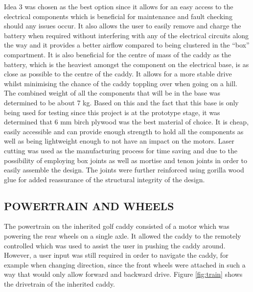 \documentclass[11pt,landscape]{article}
\begin{document}
\begin{multicols}{2}
    
    Idea 3 was chosen as the best option since it allows for an easy access to
    the electrical components which is beneficial for maintenance and fault
    checking should any issues occur. It also allows the user to easily remove
    and charge the battery when required without interfering with any of the
    electrical circuits along the way and it provides a better airflow compared
    to being clustered in the “box” compartment. It is also beneficial for the
    centre of mass of the caddy as the battery, which is the heaviest amongst
    the component on the electrical base, is as close as possible to the centre
    of the caddy. It allows for a more stable drive whilst minimising the chance
    of the caddy toppling over when going on a hill. The combined weight of all
    the components that will be in the base was determined to be about 7 kg.
    Based on this and the fact that this base is only being used for testing
    since this project is at the prototype stage, it was determined that 6 mm
    birch plywood was the best material of choice. It is cheap, easily
    accessible and can provide enough strength to hold all the components as
    well as being lightweight enough to not have an impact on the motors. Laser
    cutting was used as the manufacturing process for time saving and due to the
    possibility of employing box joints as well as mortise and tenon joints in
    order to easily assemble the design. The joints were further reinforced
    using gorilla wood glue for added reassurance of the structural integrity of
    the design.
    
    
    
    
    \subsection{POWERTRAIN AND WHEELS}
    The powertrain on the inherited golf caddy consisted of a motor which was
    powering the rear wheels on a single axle. It allowed the caddy to the
    remotely controlled which was used to assist the user in pushing the caddy
    around. However, a user input was still required in order to navigate the
    caddy, for example when changing direction, since the front wheels were
    attached in such a way that would only allow forward and backward drive.
    Figure \ref{fig:train} shows the drivetrain of the inherited caddy.
    

\end{multicols}
\end{document}
